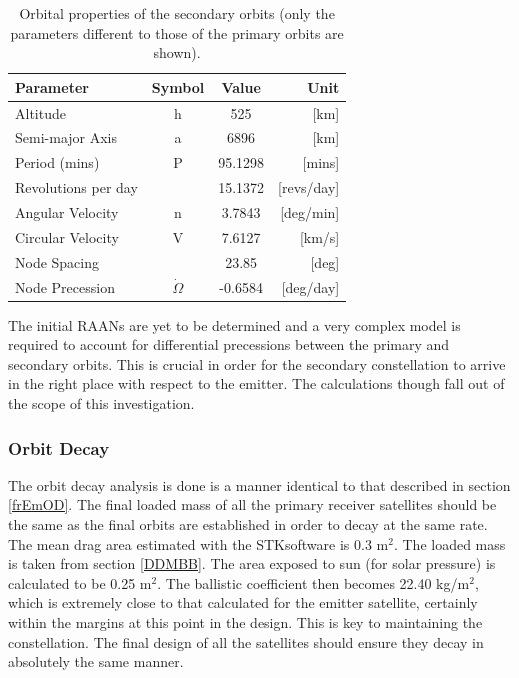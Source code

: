 \begin{table}[!h]
\begin{centering}
\begin{tabular}{lccr}
\toprule
Parameter				&			Symbol			&			Value			&			Unit \\
\hline \hline
Altitude				&			h						&			525			&			[km]	 \\
Semi-major Axis	&			a						&			6896			&			[km]	 \\
Period (mins)		&			P						&			95.1298	&			[mins]	 \\
Revolutions per day		&									&			15.1372	&			[revs/day]	 \\
Angular Velocity		&			n						&			3.7843	&			[deg/min]	 \\
Circular Velocity		&			V						&			7.6127	&			[km/s]	 \\
Node Spacing	&			 						&			23.85	&			[deg]	 \\
Node Precession	&			 $\dot{\Omega}$					&			-0.6584	&			[deg/day]	 \\
\bottomrule
\end{tabular}
\caption{Orbital properties of the secondary orbits (only the parameters different to those of the primary orbits are shown).}
\label{table:orbsecref}
\end{centering}
\end{table}

The initial RAANs are yet to be determined and a very complex model is required to account for differential precessions between the primary and secondary orbits. This is crucial in order for the secondary constellation to arrive in the right place with respect to the emitter. The calculations though fall out of the scope of this investigation.

\subsubsection{Orbit Decay}
\label{frRecOD}

The orbit decay analysis is done is a manner identical to that described in section \ref{frEmOD}. The final loaded mass of all the primary receiver satellites should be the same as the final orbits are established in order to decay at the same rate. The mean drag area estimated with the STK\texttrademark software is 0.3 m$^2$. The loaded mass is taken from section \ref{DDMBB}. The area exposed to sun (for solar pressure) is calculated to be 0.25 m$^2$. The ballistic coefficient then becomes 22.40 kg/m$^2$, which is extremely close to that calculated for the emitter satellite, certainly within the margins at this point in the design. This is key to maintaining the constellation. The final design of all the satellites should ensure they decay in absolutely the same manner.

